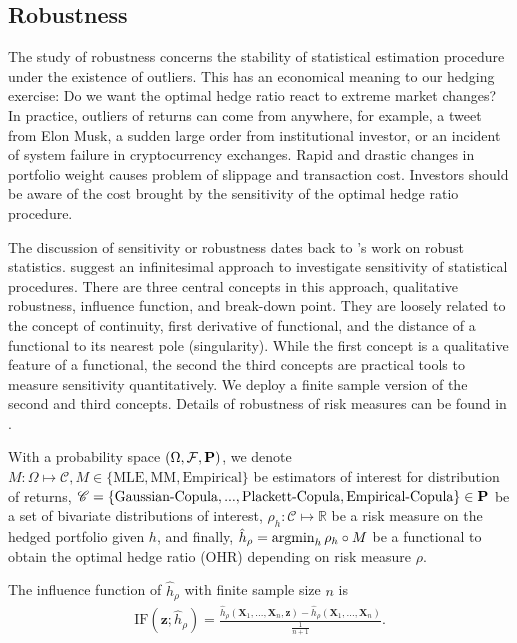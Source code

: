\subsection{Robustness}\label{subsec:robustness}
The study of robustness concerns the stability of statistical estimation procedure under the existence of outliers.
This has an economical meaning to our hedging exercise: Do we want the optimal hedge ratio react to extreme market changes?
In practice, outliers of returns can come from anywhere, for example, a tweet from Elon Musk, a sudden large order from
institutional investor, or an incident of system failure in cryptocurrency exchanges.
Rapid and drastic changes in portfolio weight causes problem of slippage and transaction cost.
Investors should be aware of the cost brought by the sensitivity of the optimal hedge ratio procedure.
\medskip

The discussion of sensitivity or robustness dates back to \citet{huber1981robust}'s work on robust statistics.
\citet{hampel2011robust} suggest an infinitesimal approach to investigate sensitivity of statistical procedures.
There are three central concepts in this approach, qualitative robustness, influence function, and break-down point.
They are loosely related to the concept of continuity, first derivative of functional, and the distance of a functional to its nearest pole (singularity).
While the first concept is a qualitative feature of a functional, the second the third concepts are practical tools to measure sensitivity quantitatively.
We deploy a finite sample version of the second and third concepts.
Details of robustness of risk measures can be found in \citet{cont2010robustness}. \medskip

With a probability space $(\Omega, {\cal F}, {\bf P})$,
we denote $M: \Omega \mapsto \mathscr{C}, M \in \{\text{MLE}, \text{MM}, \text{Empirical}\}$ be estimators of interest for distribution of returns,
$\mathscr{C} = \{\text{Gaussian-Copula}, ..., \text{Plackett-Copula}, \text{Empirical-Copula}\} \in {\bf P}$ be a set of bivariate distributions of interest,
$\rho_{h}: \mathscr{C} \mapsto \mathbb{R}$ be a risk measure on the hedged portfolio given $h$,
and finally, $\hat h_\rho = \argmin_h \rho_{h} \circ M$ be a functional to obtain the optimal hedge ratio (OHR) depending on risk measure
$\rho$. \medskip

The influence function of $\hat h_\rho$ with finite sample size $n$ is
\begin{align}
    \text{IF}(\bm{z}; \hat h_\rho) = \frac{\hat h_\rho(\bm{X}_1,...,\bm{X}_n, \bm{z})-
    \hat h_\rho(\bm{X}_1,...,\bm{X}_n)}{\frac{1}{n+1}}.
    \end{align}

